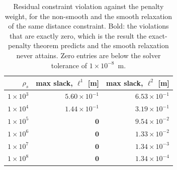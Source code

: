 \begin{table}[htbp]
  \centering
  \small
  \caption{Residual constraint violation against the penalty weight, for the non-smooth and the smooth relaxation of the same distance constraint. Bold: the violations that are exactly zero, which is the result the exact-penalty theorem predicts and the smooth relaxation never attains. Zero entries are below the solver tolerance of $1\times 10^{-8}$~m.}
  \label{res:tab:penalty}
  \begin{tabular}{rrr}
    \toprule
    $\rho_s$ & max slack, $\ell^1$ [m] & max slack, $\ell^2$ [m] \\
    \midrule
    $1\times 10^{3}$ & $5.60\times 10^{-1}$ & $6.53\times 10^{-1}$ \\
    $1\times 10^{4}$ & $1.44\times 10^{-1}$ & $3.19\times 10^{-1}$ \\
    $1\times 10^{5}$ & $\mathbf{0}$ & $9.54\times 10^{-2}$ \\
    $1\times 10^{6}$ & $\mathbf{0}$ & $1.33\times 10^{-2}$ \\
    $1\times 10^{7}$ & $\mathbf{0}$ & $1.34\times 10^{-3}$ \\
    $1\times 10^{8}$ & $\mathbf{0}$ & $1.34\times 10^{-4}$ \\
    \bottomrule
  \end{tabular}
\end{table}

